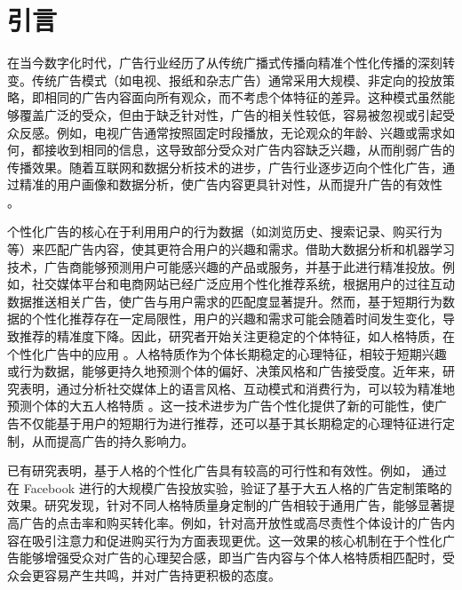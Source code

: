 \chapter{引言}
在当今数字化时代，广告行业经历了从传统广播式传播向精准个性化传播的深刻转变。传统广告模式（如电视、报纸和杂志广告）通常采用大规模、非定向的投放策略，即相同的广告内容面向所有观众，而不考虑个体特征的差异。这种模式虽然能够覆盖广泛的受众，但由于缺乏针对性，广告的相关性较低，容易被忽视或引起受众反感。例如，电视广告通常按照固定时段播放，无论观众的年龄、兴趣或需求如何，都接收到相同的信息，这导致部分受众对广告内容缺乏兴趣，从而削弱广告的传播效果。随着互联网和数据分析技术的进步，广告行业逐步迈向个性化广告，通过精准的用户画像和数据分析，使广告内容更具针对性，从而提升广告的有效性 \citep{teeny2021review}。

个性化广告的核心在于利用用户的行为数据（如浏览历史、搜索记录、购买行为等）来匹配广告内容，使其更符合用户的兴趣和需求。借助大数据分析和机器学习技术，广告商能够预测用户可能感兴趣的产品或服务，并基于此进行精准投放。例如，社交媒体平台和电商网站已经广泛应用个性化推荐系统，根据用户的过往互动数据推送相关广告，使广告与用户需求的匹配度显著提升。然而，基于短期行为数据的个性化推荐存在一定局限性，用户的兴趣和需求可能会随着时间发生变化，导致推荐的精准度下降。因此，研究者开始关注更稳定的个体特征，如人格特质，在个性化广告中的应用 \citep{backteman1981longitudinal}。人格特质作为个体长期稳定的心理特征，相较于短期兴趣或行为数据，能够更持久地预测个体的偏好、决策风格和广告接受度。近年来，研究表明，通过分析社交媒体上的语言风格、互动模式和消费行为，可以较为精准地预测个体的大五人格特质 \citep{markovikj2013mining}。这一技术进步为广告个性化提供了新的可能性，使广告不仅能基于用户的短期行为进行推荐，还可以基于其长期稳定的心理特征进行定制，从而提高广告的持久影响力。

已有研究表明，基于人格的个性化广告具有较高的可行性和有效性。例如，\citet{matz2017psychological} 通过在 Facebook 进行的大规模广告投放实验，验证了基于大五人格的广告定制策略的效果。研究发现，针对不同人格特质量身定制的广告相较于通用广告，能够显著提高广告的点击率和购买转化率。例如，针对高开放性或高尽责性个体设计的广告内容在吸引注意力和促进购买行为方面表现更优。这一效果的核心机制在于个性化广告能够增强受众对广告的心理契合感\citep{teeny2021review}，即当广告内容与个体人格特质相匹配时，受众会更容易产生共鸣，并对广告持更积极的态度。

